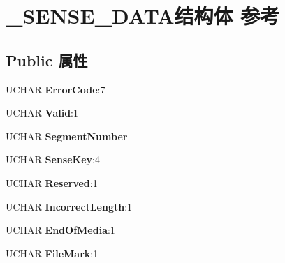 \hypertarget{struct___s_e_n_s_e___d_a_t_a}{}\section{\+\_\+\+S\+E\+N\+S\+E\+\_\+\+D\+A\+T\+A结构体 参考}
\label{struct___s_e_n_s_e___d_a_t_a}
\subsection*{Public 属性}
\begin{DoxyCompactItemize}
\item 
\mbox{\label{struct___s_e_n_s_e___d_a_t_a_a801d21a11c908e89dd7cc4613708a8f8}} 
U\+C\+H\+AR {\bfseries Error\+Code}\+:7
\item 
\mbox{\label{struct___s_e_n_s_e___d_a_t_a_ae7803464ebbc41ef09713e1a3db96d75}} 
U\+C\+H\+AR {\bfseries Valid}\+:1
\item 
\mbox{\label{struct___s_e_n_s_e___d_a_t_a_a9ec3c55d791dc9debb8e30adba718e7f}} 
U\+C\+H\+AR {\bfseries Segment\+Number}
\item 
\mbox{\label{struct___s_e_n_s_e___d_a_t_a_acb90765d7c0dc83a74006a4b5ba5e328}} 
U\+C\+H\+AR {\bfseries Sense\+Key}\+:4
\item 
\mbox{\label{struct___s_e_n_s_e___d_a_t_a_a587b5b19ccae14fea1e712baf2784fa7}} 
U\+C\+H\+AR {\bfseries Reserved}\+:1
\item 
\mbox{\label{struct___s_e_n_s_e___d_a_t_a_ac7eaeb6849f7408de7073c74ac6283ac}} 
U\+C\+H\+AR {\bfseries Incorrect\+Length}\+:1
\item 
\mbox{\label{struct___s_e_n_s_e___d_a_t_a_a99024bd2d13d69201f1de2561d4276ca}} 
U\+C\+H\+AR {\bfseries End\+Of\+Media}\+:1
\item 
\mbox{\label{struct___s_e_n_s_e___d_a_t_a_a5e9cb72491d0b2efc969af7e2d423b66}} 
U\+C\+H\+AR {\bfseries File\+Mark}\+:1
\item 

\end{DoxyCompactItemize}
